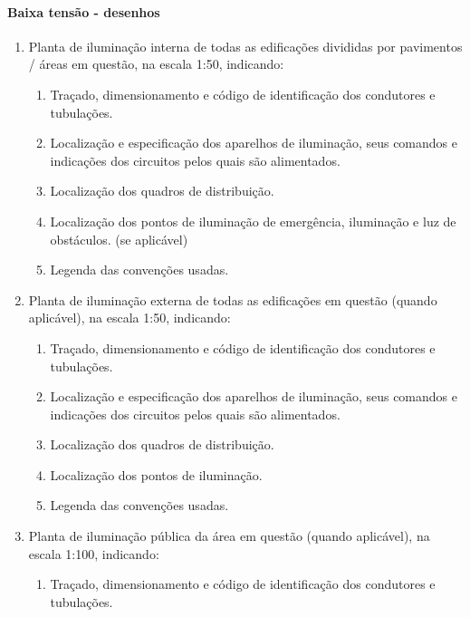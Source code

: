 \paragraph{Baixa tensão - desenhos}
	\begin{enumerate}

		\item Planta de iluminação interna de todas as edificações divididas por pavimentos / áreas em questão, na escala 1:50, indicando:
			\begin{enumerate}
				\item Traçado, dimensionamento e código de identificação dos condutores e tubulações.

				\item Localização e especificação dos aparelhos de iluminação, seus comandos e indicações dos circuitos pelos quais são alimentados.

				\item Localização dos quadros de distribuição.

				\item Localização dos pontos de iluminação de emergência, iluminação e luz de obstáculos. (se aplicável)

				\item Legenda das convenções usadas.

			\end{enumerate}
		
		\item Planta de iluminação externa de todas as edificações em questão (quando aplicável), na escala 1:50, indicando:
		\begin{enumerate}
			\item Traçado, dimensionamento e código de identificação dos condutores e tubulações.
			
			\item Localização e especificação dos aparelhos de iluminação, seus comandos e indicações dos circuitos pelos quais são alimentados.
			
			\item Localização dos quadros de distribuição.
			
			\item Localização dos pontos de iluminação.
			
			\item Legenda das convenções usadas.
		\end{enumerate}
	
		\item Planta de iluminação pública da área em questão (quando aplicável), na escala 1:100, indicando:
		\begin{enumerate}
			\item Traçado, dimensionamento e código de identificação dos condutores e tubulações.
			

\end{enumerate}
\end{enumerate}
